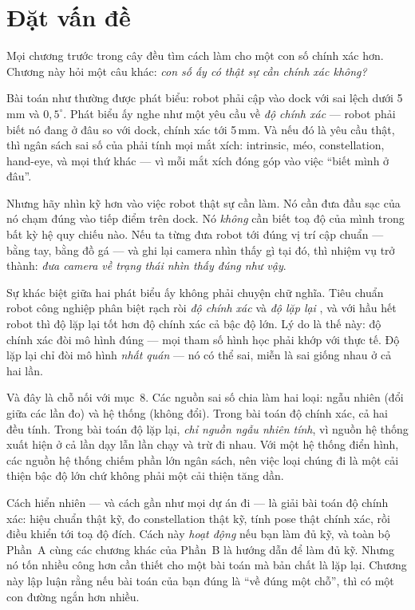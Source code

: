 \documentclass[../../marker.tex]{subfiles}
\begin{document}
\section{Đặt vấn đề}

Mọi chương trước trong cây đều tìm cách làm cho một con số chính xác hơn. Chương này hỏi một câu khác: \emph{con số ấy có thật sự cần chính xác không?}

Bài toán như thường được phát biểu: robot phải cập vào dock với sai lệch dưới 5\,mm và \(0{,}5^\circ\). Phát biểu ấy nghe như một yêu cầu về \emph{độ chính xác} --- robot phải biết nó đang ở đâu so với dock, chính xác tới 5\,mm. Và nếu đó là yêu cầu thật, thì ngân sách sai số của  phải tính mọi mắt xích: intrinsic, méo, constellation, hand-eye, và mọi thứ khác --- vì mỗi mắt xích đóng góp vào việc ``biết mình ở đâu''.

Nhưng hãy nhìn kỹ hơn vào việc robot thật sự cần làm. Nó cần đưa đầu sạc của nó chạm đúng vào tiếp điểm trên dock. Nó \emph{không} cần biết toạ độ của mình trong bất kỳ hệ quy chiếu nào. Nếu ta từng đưa robot tới đúng vị trí cập chuẩn --- bằng tay, bằng đồ gá --- và ghi lại camera nhìn thấy gì tại đó, thì nhiệm vụ trở thành: \emph{đưa camera về trạng thái nhìn thấy đúng như vậy}.

Sự khác biệt giữa hai phát biểu ấy không phải chuyện chữ nghĩa. Tiêu chuẩn robot công nghiệp phân biệt rạch ròi \emph{độ chính xác} và \emph{độ lặp lại} \cite{iso9283}, và với hầu hết robot thì độ lặp lại tốt hơn độ chính xác cả bậc độ lớn. Lý do là thế này: độ chính xác đòi mô hình đúng --- mọi tham số hình học phải khớp với thực tế. Độ lặp lại chỉ đòi mô hình \emph{nhất quán} --- nó có thể sai, miễn là sai giống nhau ở cả hai lần.

Và đây là chỗ nối với  mục~8. Các nguồn sai số chia làm hai loại: ngẫu nhiên (đổi giữa các lần đo) và hệ thống (không đổi). Trong bài toán độ chính xác, cả hai đều tính. Trong bài toán độ lặp lại, \emph{chỉ nguồn ngẫu nhiên tính}, vì nguồn hệ thống xuất hiện ở cả lần dạy lẫn lần chạy và trừ đi nhau. Với một hệ thống điển hình, các nguồn hệ thống chiếm phần lớn ngân sách, nên việc loại chúng đi là một cải thiện bậc độ lớn chứ không phải một cải thiện tăng dần.

Cách hiển nhiên --- và cách gần như mọi dự án đi --- là giải bài toán độ chính xác: hiệu chuẩn thật kỹ, đo constellation thật kỹ, tính pose thật chính xác, rồi điều khiển tới toạ độ đích. Cách này \emph{hoạt động} nếu bạn làm đủ kỹ, và toàn bộ Phần~A cùng các chương khác của Phần~B là hướng dẫn để làm đủ kỹ. Nhưng nó tốn nhiều công hơn cần thiết cho một bài toán mà bản chất là lặp lại. Chương này lập luận rằng nếu bài toán của bạn đúng là ``về đúng một chỗ'', thì có một con đường ngắn hơn nhiều.
\end{document}
